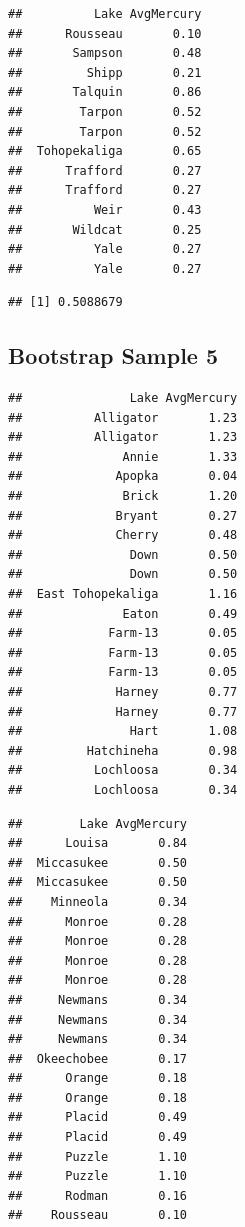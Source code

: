 \documentclass[]{book}
\newenvironment{Shaded}{\begin{snugshade}}{\end{snugshade}}
\newcommand{\KeywordTok}[1]{\textcolor[rgb]{0.13,0.29,0.53}{\textbf{#1}}}
\newcommand{\OperatorTok}[1]{\textcolor[rgb]{0.81,0.36,0.00}{\textbf{#1}}}
\newcommand{\NormalTok}[1]{#1}
\begin{document}
\begin{verbatim}
##          Lake AvgMercury
##      Rousseau       0.10
##       Sampson       0.48
##         Shipp       0.21
##       Talquin       0.86
##        Tarpon       0.52
##        Tarpon       0.52
##  Tohopekaliga       0.65
##      Trafford       0.27
##      Trafford       0.27
##          Weir       0.43
##       Wildcat       0.25
##          Yale       0.27
##          Yale       0.27
\end{verbatim}

\begin{Shaded}
\end{Shaded}

\begin{verbatim}
## [1] 0.5088679
\end{verbatim}

\subsection{Bootstrap Sample 5}\label{bootstrap-sample-5}

\begin{verbatim}
##               Lake AvgMercury
##          Alligator       1.23
##          Alligator       1.23
##              Annie       1.33
##             Apopka       0.04
##              Brick       1.20
##             Bryant       0.27
##             Cherry       0.48
##               Down       0.50
##               Down       0.50
##  East Tohopekaliga       1.16
##              Eaton       0.49
##            Farm-13       0.05
##            Farm-13       0.05
##            Farm-13       0.05
##             Harney       0.77
##             Harney       0.77
##               Hart       1.08
##         Hatchineha       0.98
##          Lochloosa       0.34
##          Lochloosa       0.34
\end{verbatim}

\begin{verbatim}
##        Lake AvgMercury
##      Louisa       0.84
##  Miccasukee       0.50
##  Miccasukee       0.50
##    Minneola       0.34
##      Monroe       0.28
##      Monroe       0.28
##      Monroe       0.28
##      Monroe       0.28
##     Newmans       0.34
##     Newmans       0.34
##     Newmans       0.34
##  Okeechobee       0.17
##      Orange       0.18
##      Orange       0.18
##      Placid       0.49
##      Placid       0.49
##      Puzzle       1.10
##      Puzzle       1.10
##      Rodman       0.16
##    Rousseau       0.10
\end{verbatim}
\end{document}
